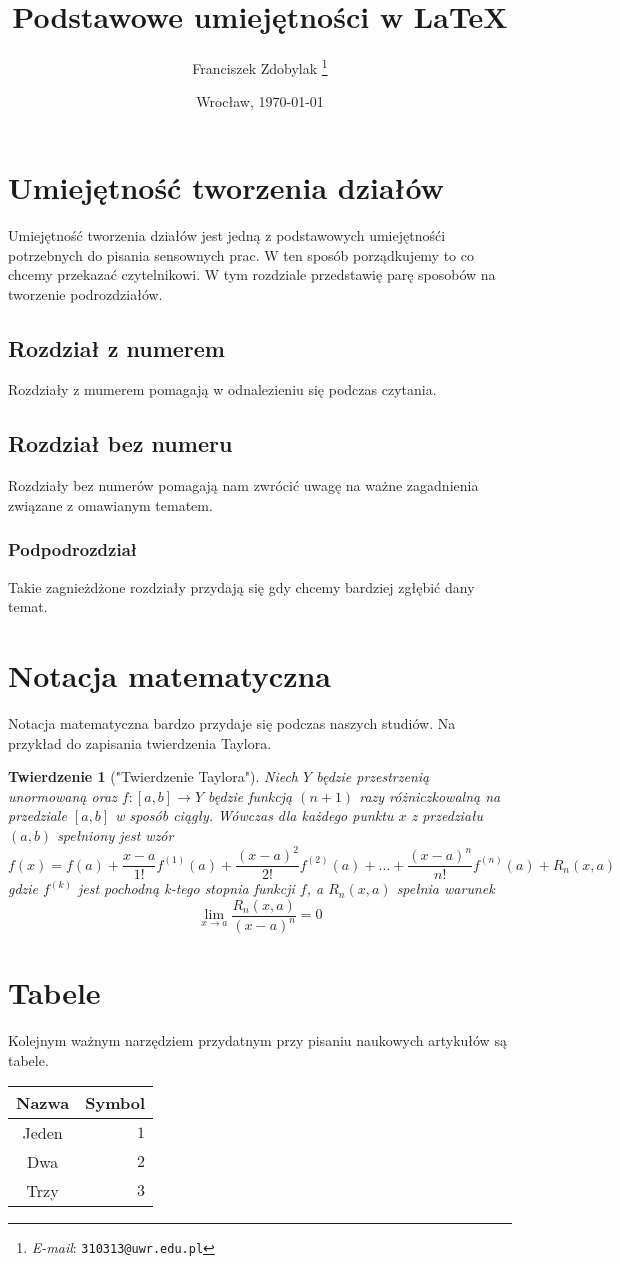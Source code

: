 \documentclass[11pt,wide]{mwart}
\date{Wrocław, \today}
\title{\Large\textbf{Podstawowe umiejętności w \LaTeX} }
\author{Franciszek Zdobylak \thanks{\textit{E-mail}: \texttt{310313@uwr.edu.pl}}}
\newtheorem{tw}{Twierdzenie}
\begin{document}
\maketitle
\tableofcontents

\section{Umiejętność tworzenia działów}
Umiejętność tworzenia działów jest jedną z podstawowych umiejętnośći potrzebnych do pisania
sensownych prac. W ten sposób porządkujemy to co chcemy przekazać czytelnikowi. 
W tym rozdziale przedstawię parę sposobów na tworzenie podrozdziałów.

\subsection{Rozdział z numerem}
Rozdziały z mumerem pomagają w odnalezieniu się podczas czytania.
\subsection*{Rozdział bez numeru}
Rozdziały bez numerów pomagają nam zwrócić uwagę na ważne zagadnienia związane z omawianym tematem.
\subsubsection{Podpodrozdział}
Takie zagnieżdżone rozdziały przydają się gdy chcemy bardziej zgłębić dany temat.

\section{Notacja matematyczna}

Notacja matematyczna bardzo przydaje się podczas naszych studiów. Na przykład do zapisania
twierdzenia Taylora.

\begin{tw}["Twierdzenie Taylora"]
  Niech $Y$ będzie przestrzenią unormowaną oraz $f: [a,b] \rightarrow Y$ będzie funkcją
  $(n+1)$ razy różniczkowalną na przedziale $[a,b]$ w sposób ciągły. 
  Wówczas dla każdego punktu $x$ z przedziału $(a,b)$ spełniony jest wzór
  $$ f(x) = f(a) + \frac{x - a}{1!} f^{(1)}(a) + \frac{(x-a)^2}{2!} f^{(2)}(a) + \dots
    + \frac{(x-a)^n}{n!} f^{(n)}(a) + R_n(x, a)$$
  gdzie $f^{(k)}$ jest pochodną k-tego stopnia funkcji $f$, a $R_n(x,a)$ spełnia warunek
  $$ \lim_{x\rightarrow a}{\frac{R_n(x,a)}{(x - a)^n}} = 0$$
\end{tw}

\section{Tabele}
Kolejnym ważnym narzędziem przydatnym przy pisaniu naukowych artykułów są tabele.
\begin{center}
\begin{tabular}{|c|r|}
  \hline
  \textbf{Nazwa} & \textbf{Symbol}\\
  \hline
  Jeden & $1$\\
  \hline
  Dwa & $2$\\
  \hline
  Trzy & $3$\\
  \hline
\end{tabular}
\end{center}
\end{document}
